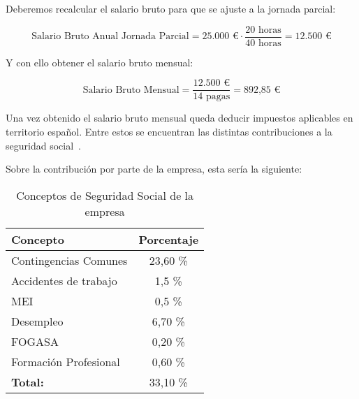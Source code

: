 Deberemos recalcular el salario bruto para que se ajuste a la jornada parcial:

\[
\text{Salario Bruto Anual Jornada Parcial} = \text{25.000 €}  \cdot \frac{\text{20 horas}}{\text{40 horas}} = \text{12.500 €}
\]

Y con ello obtener el salario bruto mensual:

\[
\text{Salario Bruto Mensual} = \frac{\text{12.500 €}}{\text{14 pagas}} = \text{892,85 €}
\]

Una vez obtenido el salario bruto mensual queda deducir impuestos aplicables en territorio español. Entre estos se encuentran las distintas contribuciones a la seguridad social~\cite{segsocialSeguridadSocial}.


%
%

Sobre la contribución por parte de la empresa, esta sería la siguiente:

\begin{table}[h!]
	\centering
	\begin{tabular}{| l | c |}
		\toprule
		\textbf{Concepto} & \textbf{Porcentaje} \\ \midrule
		Contingencias Comunes & 23,60 \%\\
		Accidentes de trabajo & 1,5 \%\\
		MEI & 0,5 \%\\
		Desempleo & 6,70 \% \\
		FOGASA & 0,20 \%\\
		Formación Profesional & 0,60 \% \\
		\midrule
		\textbf{Total:} & 33,10 \% \\
		\bottomrule
	\end{tabular}
	\caption{Conceptos de Seguridad Social de la empresa}
	\label{SSempresa}
\end{table}

